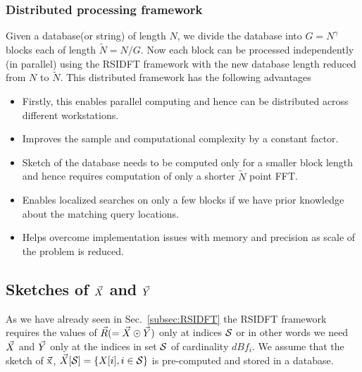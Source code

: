 \subsubsection{Distributed processing framework}
Given a database(or string) of length $N$, we divide the database into $G=N^\gamma$ blocks each of length $\tilde{N} = N/G$. Now each block can be processed independently (in parallel) using the RSIDFT framework with the new database length reduced from $N$ to $\tilde{N}$. This distributed framework has the following advantages
\begin{itemize}
	\item Firstly, this enables parallel computing and hence can be distributed across different workstations.
	\item Improves the sample and computational complexity by a constant factor.
	\item Sketch of the database needs to be computed only for a smaller block length and hence requires computation of only a shorter $\tilde{N}$ point FFT.
	\item Enables localized searches on only a few blocks if we have prior knowledge about the matching query locations. %
	\item Helps overcome implementation issues with memory and precision as scale of the problem is reduced. 
\end{itemize}
\subsection{Sketches of $\vec{X}$ and $\vec{Y}$}
\label{subsec:skteches}		
 As we have already seen in Sec.~\ref{subsec:RSIDFT} the RSIDFT framework requires the values of $\vec{R}(=\vec{X}\odot \vec{Y})$ only at indices $\mathcal{S}$ or in other words we need $\vec{X}$ and $\vec{Y}$ only at the indices in set $\mathcal{S}$ of cardinality $dBf_i$. We assume that the sketch of $\vec{\mathrm{x}}$, $ \vec{X}[\mathcal{S}]= \{X[i],i\in \mathcal{S}\}$ is pre-computed and stored in a database.

